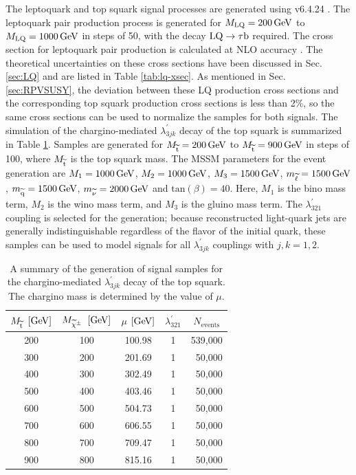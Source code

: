 \documentclass[12pt]{thesis}  %
\newcommand{\MLQ}{\ensuremath{M_{\text{LQ}}}\xspace}
\newcommand{\Mstop}{\ensuremath{M_{\sTop}}\xspace}
\begin{document}
The leptoquark and top squark signal processes are generated using \PYTHIA v6.4.24 \cite{Sjostrand:2006za}. The leptoquark pair production process is generated for $\MLQ=200\GeV$ to $\MLQ=1000\GeV$ in steps of 50\GeV, with the decay $\text{LQ} \rightarrow \tau \mathrm{b}$ required. The cross section for leptoquark pair production is calculated at NLO accuracy \cite{LQxsec}. The theoretical uncertainties on these cross sections have been discussed in Sec. \ref{sec:LQ} and are listed in Table \ref{tab:lq-xsec}. As mentioned in Sec. \ref{sec:RPVSUSY}, the deviation between these LQ production cross sections and the corresponding top squark production cross sections is less than 2\%, so the same cross sections can be used to normalize the samples for both signals. The simulation of the chargino-mediated $\lambda_{3jk}^{\prime}$ decay of the top squark is summarized in Table \ref{tab:LQD321-samples}. Samples are generated for $\Mstop=200\GeV$ to $\Mstop=900\GeV$ in steps of 100\GeV, where $\Mstop$ is the top squark mass. The MSSM parameters for the event generation are $M_1=1000\,\text{Ge\hspace{-.08em}V}$, $M_2=1000\,\text{Ge\hspace{-.08em}V}$, $M_3=1500\,\text{Ge\hspace{-.08em}V}$, $m_{\widetilde{\mathrm{\ell}}}=1500\,\text{Ge\hspace{-.08em}V}$, $m_{\widetilde{\mathrm{q}}}=1500\,\text{Ge\hspace{-.08em}V}$, $m_{\widetilde{\nu}}=2000\,\text{Ge\hspace{-.08em}V}$ and $\text{tan}(\beta)=40$. Here, $M_1$ is the bino mass term, $M_2$ is the wino mass term, and $M_3$ is the gluino mass term. The $\lambda_{321}^{\prime}$ coupling is selected for the generation; because reconstructed light-quark jets are generally indistinguishable regardless of the flavor of the initial quark, these samples can be used to model signals for all $\lambda_{3jk}^{\prime}$ couplings with $j,k=1,2$.

\begin{table}[htb]
  \begin{center}
    \begin{tabular}{|c|c|c|c|r|}
\hline
$\Mstop$ $[\text{Ge\hspace{-.08em}V}]$    &    $M_{\widetilde{\chi}^{\pm}}$ $[\text{Ge\hspace{-.08em}V}]$    &   $\mu$ $[\text{Ge\hspace{-.08em}V}]$  & $\lambda_{321}^{\prime}$ & \multicolumn{1}{c|}{$N_{\text{events}}$} \\
\hline \hline
200   &      100   &  100.98 & 1  &   539,000   \\
300   &      200   &  201.69 & 1  &   50,000   \\
400   &      300   &  302.49 & 1  &   50,000   \\
500   &      400   &  403.46 & 1  &   50,000   \\
600   &      500   &  504.73 & 1  &   50,000   \\
700   &      600   &  606.55 & 1  &   50,000   \\
800   &      700   &  709.47 & 1  &   50,000   \\
900   &      800   &  815.16 & 1  &   50,000   \\
\hline
\end{tabular}
\caption{A summary of the generation of signal samples for the chargino-mediated $\lambda_{3jk}^{\prime}$ decay of the top squark. The chargino mass is determined by the value of $\mu$.}
\label{tab:LQD321-samples}
\end{center}
\end{table}
\end{document}
